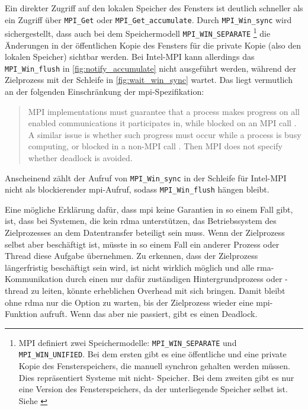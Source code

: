 Ein direkter Zugriff auf den lokalen Speicher des \gls{Fenster}s ist deutlich schneller
als ein Zugriff über \texttt{MPI\_Get} oder \texttt{MPI\_Get\_accumulate}.
Durch \texttt{MPI\_Win\_sync} wird sichergestellt,
dass auch bei dem Speichermodell \texttt{MPI\_WIN\_SEPARATE}%
\footnote{
    MPI definiert zwei Speichermodelle: \texttt{MPI\_WIN\_SEPARATE} und \texttt{MPI\_WIN\_UNIFIED}.
    Bei dem ersten gibt es eine öffentliche und eine private Kopie des Fensterspeichers,
    die manuell synchron gehalten werden müssen.
    Dies repräsentiert Systeme mit nicht- Speicher.
    Bei dem zweiten gibt es nur eine Version des Fensterspeichers,
    da der unterliegende Speicher selbst  ist.
    Siehe \cite[Kapitel 11.4, S. 435]{MPI-3.1}}
die Änderungen in der öffentlichen Kopie des \gls{Fenster}s für die private Kopie (also den lokalen Speicher) sichtbar werden.
Bei Intel-MPI kann allerdings das \texttt{MPI\_Win\_flush} in \autoref{fig:notify_accumulate} nicht ausgeführt werden,
während der Zielprozess mit der Schleife in \autoref{fig:wait_win_sync} wartet.
Das liegt vermutlich an der folgenden Einschränkung der \gls{mpi}-Spezifikation:
\foreignblockcquote{english}[Kapitel 11.7, S. 456]{MPI-3.1}{%
    MPI implementations must guarantee that a process makes progress on all
    enabled communications it participates in, while blocked on an MPI call \textelp{}.
    A similar issue is whether such progress must occur while a process is busy computing,
    or blocked in a non-MPI call \textelp{}. Then MPI does not specify
    whether deadlock is avoided.}
Anscheinend zählt der Aufruf von \texttt{MPI\_Win\_sync} in der Schleife für Intel-MPI nicht als blockierender \gls{mpi}-Aufruf,
sodass \texttt{MPI\_Win\_flush} hängen bleibt.

Eine mögliche Erklärung dafür,
dass \gls{mpi} keine Garantien in so einem Fall gibt,
ist,
dass bei Systemen,
die kein \gls{rdma} unterstützen,
das Betriebssystem des Zielprozesses an dem Datentransfer beteiligt sein muss.
Wenn der Zielprozess selbst aber beschäftigt ist,
müsste in so einem Fall ein anderer Prozess oder Thread diese Aufgabe übernehmen.
Zu erkennen,
dass der Zielprozess längerfristig beschäftigt sein wird,
ist nicht wirklich möglich und alle \gls{rma}-Kommunikation durch einen nur dafür zuständigen Hintergrundprozess oder -thread zu leiten,
könnte erheblichen Overhead mit sich bringen.
Damit bleibt ohne \gls{rdma} nur die Option zu warten,
bis der Zielprozess wieder eine \gls{mpi}-Funktion aufruft.
Wenn das aber nie passiert,
gibt es einen Deadlock.

